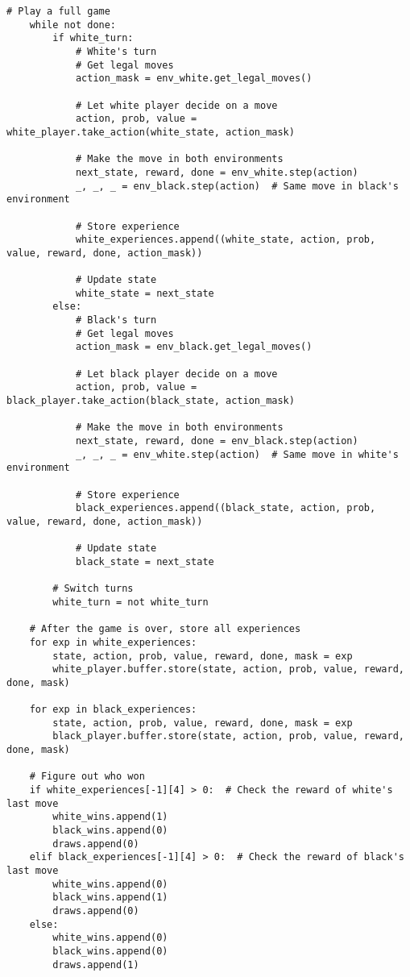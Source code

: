 \documentclass[11pt]{article}
\begin{document}
\begin{tcolorbox}[colback=green!10!white,colframe=green!75!black,title=Complete Training Script,width=\textwidth]
\begin{minipage}{0.48\textwidth}
\begin{lstlisting}[style=Python,basicstyle=\ttfamily\scriptsize]
    # Play a full game
    while not done:
        if white_turn:
            # White's turn
            # Get legal moves
            action_mask = env_white.get_legal_moves()
            
            # Let white player decide on a move
            action, prob, value = white_player.take_action(white_state, action_mask)
            
            # Make the move in both environments
            next_state, reward, done = env_white.step(action)
            _, _, _ = env_black.step(action)  # Same move in black's environment
            
            # Store experience
            white_experiences.append((white_state, action, prob, value, reward, done, action_mask))
            
            # Update state
            white_state = next_state
        else:
            # Black's turn
            # Get legal moves
            action_mask = env_black.get_legal_moves()
            
            # Let black player decide on a move
            action, prob, value = black_player.take_action(black_state, action_mask)
            
            # Make the move in both environments
            next_state, reward, done = env_black.step(action)
            _, _, _ = env_white.step(action)  # Same move in white's environment
            
            # Store experience
            black_experiences.append((black_state, action, prob, value, reward, done, action_mask))
            
            # Update state
            black_state = next_state
        
        # Switch turns
        white_turn = not white_turn
    
    # After the game is over, store all experiences
    for exp in white_experiences:
        state, action, prob, value, reward, done, mask = exp
        white_player.buffer.store(state, action, prob, value, reward, done, mask)
    
    for exp in black_experiences:
        state, action, prob, value, reward, done, mask = exp
        black_player.buffer.store(state, action, prob, value, reward, done, mask)
    
    # Figure out who won
    if white_experiences[-1][4] > 0:  # Check the reward of white's last move
        white_wins.append(1)
        black_wins.append(0)
        draws.append(0)
    elif black_experiences[-1][4] > 0:  # Check the reward of black's last move
        white_wins.append(0)
        black_wins.append(1)
        draws.append(0)
    else:
        white_wins.append(0)
        black_wins.append(0)
        draws.append(1)
    

\end{lstlisting}
\end{minipage}
\end{tcolorbox}
\end{document}
